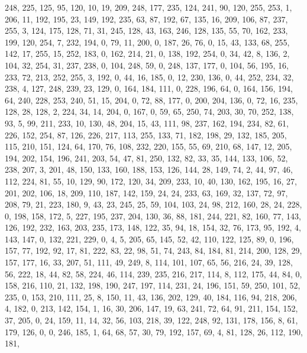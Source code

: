 \begin{DoxyCode}
       248, 225, 125, 95, 120, 10, 19, 209, 248, 177, 235, 124, 241, 90, 120, 255, 253, 1, 206, 11, 192, 195, 23,
       149, 192, 235, 63, 87, 192, 67, 135, 16, 209, 106, 87, 237, 255, 3, 124, 175, 128, 71, 31, 245, 128, 43,
       163, 246, 128, 135, 55, 70, 162, 233, 199, 120, 254, 7, 232, 194, 0, 79, 11, 200, 0, 187, 26, 76, 0, 15, 43,
       133, 68, 255, 142, 17, 255, 15, 252, 183, 0, 162, 214, 21, 0, 138, 192, 254, 0, 34, 42, 8, 136, 2, 104, 32,
       254, 31, 237, 238, 0, 104, 248, 59, 0, 248, 137, 177, 0, 104, 56, 195, 16, 233, 72, 213, 252, 255, 3, 192, 0,
       44, 16, 185, 0, 12, 230, 136, 0, 44, 252, 234, 32, 238, 4, 127, 248, 239, 23, 129, 0, 164, 184, 111, 0, 228,
       196, 64, 0, 164, 156, 194, 64, 240, 228, 253, 240, 51, 15, 204, 0, 72, 88, 177, 0, 200, 204, 136, 0, 72,
       16, 235, 128, 28, 128, 2, 224, 34, 14, 204, 0, 167, 0, 59, 65, 250, 74, 203, 30, 70, 252, 138, 93, 5, 99, 211,
       233, 10, 130, 48, 204, 15, 43, 111, 98, 237, 162, 194, 234, 82, 61, 226, 152, 254, 87, 126, 226, 217, 113,
       255, 133, 71, 182, 198, 29, 132, 185, 205, 115, 210, 151, 124, 64, 170, 76, 108, 232, 220, 155, 55, 69, 210,
       68, 147, 12, 205, 194, 202, 154, 196, 241, 203, 54, 47, 81, 250, 132, 82, 33, 35, 144, 133, 106, 52, 238,
       207, 3, 201, 48, 150, 133, 160, 188, 153, 126, 144, 28, 149, 74, 2, 44, 97, 46, 112, 224, 81, 55, 10, 129,
       90, 172, 120, 34, 209, 233, 10, 40, 130, 162, 195, 16, 27, 201, 202, 106, 18, 209, 110, 187, 142, 159, 24, 24,
       233, 63, 169, 32, 137, 72, 97, 208, 79, 21, 223, 180, 9, 43, 23, 245, 25, 59, 104, 103, 24, 98, 212, 160,
       28, 24, 228, 0, 198, 158, 172, 5, 227, 195, 237, 204, 130, 36, 88, 181, 244, 221, 82, 160, 77, 143, 126, 192,
       232, 163, 203, 235, 173, 148, 122, 35, 94, 18, 154, 32, 76, 173, 95, 192, 4, 143, 147, 0, 132, 221, 229, 0,
       4, 5, 205, 65, 145, 52, 42, 110, 122, 125, 89, 0, 196, 157, 77, 192, 92, 17, 81, 222, 83, 22, 98, 51, 74,
       243, 84, 184, 81, 214, 200, 128, 29, 157, 177, 16, 33, 207, 51, 111, 49, 249, 8, 114, 101, 107, 65, 56, 216,
       24, 39, 128, 56, 222, 18, 44, 82, 58, 224, 46, 114, 239, 235, 216, 217, 114, 8, 112, 175, 44, 84, 0, 158,
       216, 110, 21, 132, 198, 190, 247, 197, 114, 231, 24, 196, 151, 59, 250, 101, 52, 235, 0, 153, 210, 111, 25, 8,
       150, 11, 43, 136, 202, 129, 40, 184, 116, 94, 218, 206, 4, 182, 0, 213, 142, 154, 1, 16, 30, 206, 147, 19,
       63, 241, 72, 64, 91, 211, 154, 152, 37, 205, 0, 24, 159, 11, 14, 32, 56, 103, 218, 39, 122, 248, 92, 131,
       178, 156, 8, 61, 179, 126, 0, 0, 246, 185, 1, 64, 68, 57, 30, 79, 192, 157, 69, 4, 81, 128, 26, 112, 190, 181,

\end{DoxyCode}
